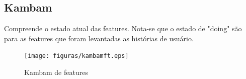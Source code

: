 \begin{anexosenv}
\section{Kambam}

Compreende o estado atual das features. Nota-se que o estado de "doing" são para as features que foram levantadas as histórias de usuário.


\begin{figure}
    \centering
    \texttt{[image: figuras/kambamft.eps]}
    \caption[Kambam de features]{Kambam de features}
\end{figure}
\end{anexosenv}
